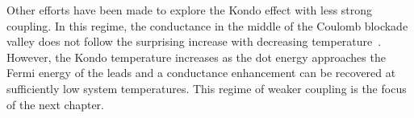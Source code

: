 Other efforts have been made to explore the Kondo effect with less strong coupling. In this regime, the conductance in the middle of the Coulomb blockade valley does not follow the surprising increase with decreasing temperature~\cite{goldhaber_mv}. However, the Kondo temperature increases as the dot energy approaches the Fermi energy of the leads and a conductance enhancement can be recovered at sufficiently low system temperatures. This regime of weaker coupling is the focus of the next chapter. 


